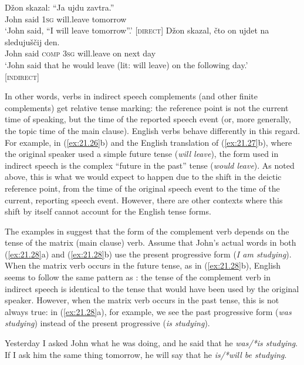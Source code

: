 \ea \label{ex:21.27}
\ea  
\gll Džon  skazal:  “Ja  ujdu  zavtra.”\\
John  said  \textsc{1sg}  will.leave  tomorrow\\
\glt ‘John said, “I will leave tomorrow”.’ \hfill  [\textsc{direct}]
\ex 
\gll Džon  skazal,  čto  on  ujdet  na  sledujuščij  den.\\
John  said  \textsc{comp}  \textsc{3sg}  will.leave  on  next  day\\
\glt ‘John said that he would leave (lit: will leave) on the following day.’ \\
\hfill  [\textsc{indirect}]
\z \z

\largerpage
In other words, verbs in  indirect speech complements (and other finite complements) get relative tense marking: the reference point is not the current time of speaking, but the time of the reported speech event (or, more generally, the topic time of the main clause). English verbs behave differently in this regard. For example, in (\ref{ex:21.26}b) and the English translation of (\ref{ex:21.27}b), where the original speaker used a simple future tense (\textit{will leave}), the form used in indirect speech is the complex “future in the past” tense (\textit{would leave}). As noted above, this is what we would expect to happen due to the shift in the deictic reference point, from the time of the original speech event to the time of the current, reporting speech event. However, there are other contexts where this shift by itself cannot account for the English tense forms.



The examples in  suggest that the form of the complement verb depends on the tense of the matrix (main clause) verb. Assume that John’s actual words in both (\ref{ex:21.28}a) and (\ref{ex:21.28}b) use the present progressive form (\textit{I am studying}). When the matrix verb occurs in the future tense, as in (\ref{ex:21.28}b), English seems to follow the same pattern as : the tense of the complement verb in indirect speech is identical to the tense that would have been used by the original speaker. However, when the matrix verb occurs in the past tense, this is not always true: in (\ref{ex:21.28}a), for example, we see the past progressive form (\textit{was studying}) instead of the present progressive (\textit{is studying}).


\ea \label{ex:21.28}
\ea  Yesterday I asked John what he was doing, and he said that he \textit{was/*is studying}.\\
\ex If I ask him the same thing tomorrow, he will say that he \textit{is/*will be studying}.
                       \z
\z


